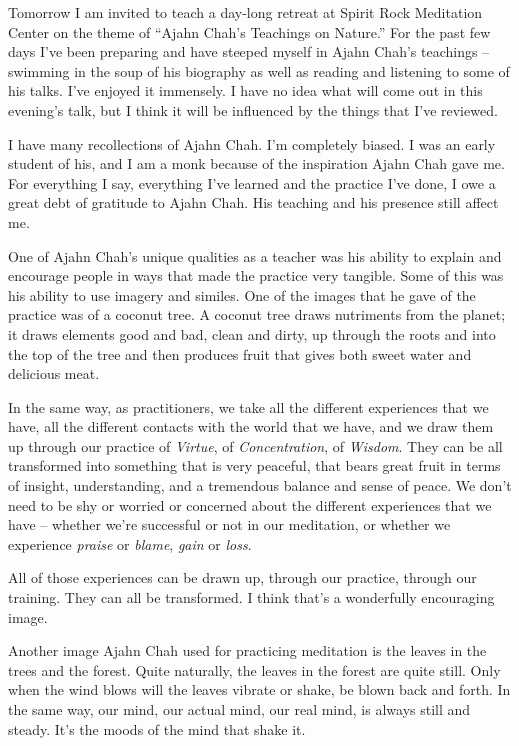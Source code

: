 
Tomorrow I am invited to teach a day-long retreat at Spirit Rock
Meditation Center on the theme of ``Ajahn Chah's Teachings on Nature.''
For the past few days I've been preparing and have steeped myself in
Ajahn Chah's teachings -- swimming in the soup of his biography as well
as reading and listening to some of his talks. I've enjoyed it
immensely. I have no idea what will come out in this evening's talk, but
I think it will be influenced by the things that I've reviewed. 

I have many recollections of Ajahn Chah. I'm completely biased. I was an
early student of his, and I am a monk because of the inspiration Ajahn
Chah gave me. For everything I say, everything I've learned and the
practice I've done, I owe a great debt of gratitude to Ajahn Chah. His
teaching and his presence still affect me. 

One of Ajahn Chah's unique qualities as a teacher was his ability to
explain and encourage people in ways that made the practice very
tangible. Some of this was his ability to use imagery and similes. One
of the images that he gave of the practice was of a coconut tree. A
coconut tree draws nutriments from the planet; it draws elements good
and bad, clean and dirty, up through the roots and into the top of the
tree and then produces fruit that gives both sweet water and delicious
meat. 

In the same way, as practitioners, we take all the different experiences
that we have, all the different contacts with the world that we have, 
and we draw them up through our practice of \emph{Virtue}, of \emph{Concentration}, of
\emph{Wisdom}. They can be all transformed into something that is very
peaceful, that bears great fruit in terms of insight, understanding, and
a tremendous balance and sense of peace. We don't need to be shy or
worried or concerned about the different experiences that we have --
whether we're successful or not in our meditation, or whether we
experience \emph{praise} or \emph{blame}, \emph{gain} or \emph{loss}. 

All of those experiences can be drawn up, through our practice, through
our training. They can all be transformed. I think that's a wonderfully
encouraging image. 

Another image Ajahn Chah used for practicing meditation is the leaves in
the trees and the forest. Quite naturally, the leaves in the forest are
quite still. Only when the wind blows will the leaves vibrate or shake, 
be blown back and forth. In the same way, our mind, our actual mind, our
real mind, is always still and steady. It's the moods of the mind that
shake it. 

